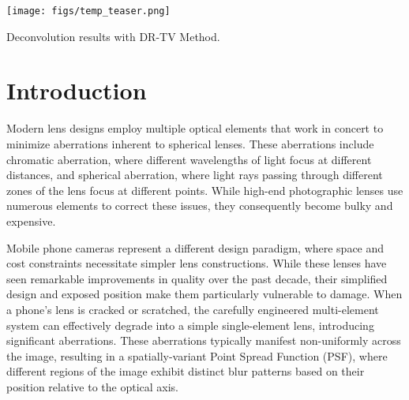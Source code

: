 \documentclass[sigconf]{acmart}
\begin{document}
\begin{teaserfigure}
  \texttt{[image: figs/temp\_teaser.png]}
  \caption{Deconvolution results with DR-TV Method.}
  \label{fig:teaser}
\end{teaserfigure}


\maketitle

\section{Introduction}
Modern lens designs employ multiple optical elements that work in concert to minimize aberrations inherent to spherical lenses. These aberrations include chromatic aberration, where different wavelengths of light focus at different distances, and spherical aberration, where light rays passing through different zones of the lens focus at different points. While high-end photographic lenses use numerous elements to correct these issues, they consequently become bulky and expensive.

Mobile phone cameras represent a different design paradigm, where space and cost constraints necessitate simpler lens constructions. While these lenses have seen remarkable improvements in quality over the past decade, their simplified design and exposed position make them particularly vulnerable to damage. When a phone's lens is cracked or scratched, the carefully engineered multi-element system can effectively degrade into a simple single-element lens, introducing significant aberrations. These aberrations typically manifest non-uniformly across the image, resulting in a spatially-variant Point Spread Function (PSF), where different regions of the image exhibit distinct blur patterns based on their position relative to the optical axis.
\end{document}
